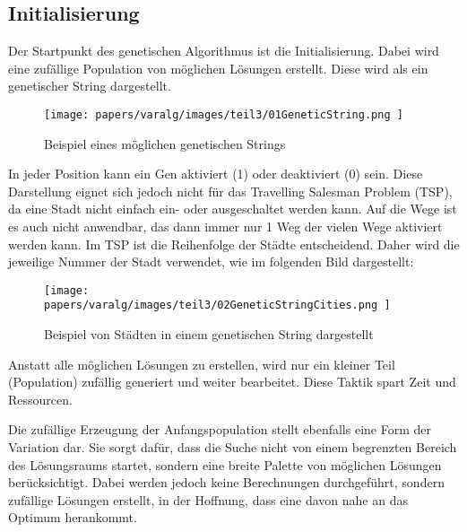 %
%
%
%
\subsection{Initialisierung
\label{buch:paper:varalg:subsection:initialization}}
Der Startpunkt des genetischen Algorithmus ist die Initialisierung.
Dabei wird eine zufällige Population von möglichen Lösungen erstellt.
Diese wird als ein genetischer String dargestellt.

\begin{figure}
	\centering
	\texttt{[image: 
        papers/varalg/images/teil3/01GeneticString.png
        ]}
	\caption{Beispiel eines möglichen genetischen Strings}
	\label{fig:possible_genetic_string}
\end{figure}

In jeder Position kann ein Gen aktiviert (1) oder deaktiviert (0) sein.
Diese Darstellung eignet sich jedoch nicht für das Travelling Salesman 
Problem (TSP), da eine Stadt nicht einfach ein- oder ausgeschaltet werden kann.
Auf die Wege ist es auch nicht anwendbar, das dann immer nur 1 Weg der vielen Wege 
aktiviert werden kann. Im TSP ist die Reihenfolge der Städte entscheidend. 
Daher wird die jeweilige Nummer der Stadt verwendet, wie im folgenden Bild 
\cite{cities_genetic_string} dargestellt:

\begin{figure}
	\centering
	\texttt{[image: 
        papers/varalg/images/teil3/02GeneticStringCities.png
        ]}
	\caption{Beispiel von Städten in einem genetischen String dargestellt}
	\label{fig:cities_genetic_string}
\end{figure}

Anstatt alle möglichen Lösungen zu erstellen, wird nur ein kleiner Teil 
(Population) zufällig generiert und weiter bearbeitet. Diese Taktik 
spart Zeit und Ressourcen.

Die zufällige Erzeugung der Anfangspopulation stellt ebenfalls eine Form 
der Variation dar. Sie sorgt dafür, dass die Suche nicht von einem begrenzten 
Bereich des Lösungsraums startet, sondern eine breite Palette von möglichen 
Lösungen berücksichtigt. Dabei werden jedoch keine Berechnungen durchgeführt, 
sondern zufällige Lösungen erstellt, in der Hoffnung, dass eine davon nahe 
an das Optimum herankommt.

